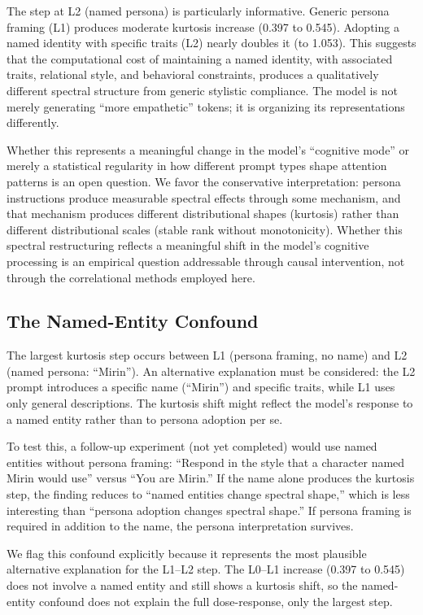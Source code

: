 \documentclass[11pt]{article}
\begin{document}
The step at L2 (named persona) is particularly informative. Generic persona framing (L1) produces moderate kurtosis increase (0.397 to 0.545). Adopting a named identity with specific traits (L2) nearly doubles it (to 1.053). This suggests that the computational cost of maintaining a named identity, with associated traits, relational style, and behavioral constraints, produces a qualitatively different spectral structure from generic stylistic compliance. The model is not merely generating ``more empathetic'' tokens; it is organizing its representations differently.

Whether this represents a meaningful change in the model's ``cognitive mode'' or merely a statistical regularity in how different prompt types shape attention patterns is an open question. We favor the conservative interpretation: persona instructions produce measurable spectral effects through some mechanism, and that mechanism produces different distributional shapes (kurtosis) rather than different distributional scales (stable rank without monotonicity). Whether this spectral restructuring reflects a meaningful shift in the model's cognitive processing is an empirical question addressable through causal intervention, not through the correlational methods employed here.

\subsection{The Named-Entity Confound}
\label{sec:named-entity-confound}

The largest kurtosis step occurs between L1 (persona framing, no name) and L2 (named persona: ``Mirin''). An alternative explanation must be considered: the L2 prompt introduces a specific name (``Mirin'') and specific traits, while L1 uses only general descriptions. The kurtosis shift might reflect the model's response to a named entity rather than to persona adoption per se.

To test this, a follow-up experiment (not yet completed) would use named entities without persona framing: ``Respond in the style that a character named Mirin would use'' versus ``You are Mirin.'' If the name alone produces the kurtosis step, the finding reduces to ``named entities change spectral shape,'' which is less interesting than ``persona adoption changes spectral shape.'' If persona framing is required in addition to the name, the persona interpretation survives.

We flag this confound explicitly because it represents the most plausible alternative explanation for the L1--L2 step. The L0--L1 increase (0.397 to 0.545) does not involve a named entity and still shows a kurtosis shift, so the named-entity confound does not explain the full dose-response, only the largest step.
\end{document}
